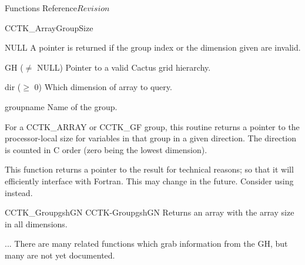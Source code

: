 \begin{cactuspart}{ Functions Reference}{}{$Revision$}
\begin{FunctionDescription}{CCTK\_ArrayGroupSize}{}
\begin{ResultSection}
\begin{Result}{NULL}
A  pointer is returned if the group index or the dimension given are invalid.
\end{Result}
\end{ResultSection}

\begin{ParameterSection}
\begin{Parameter}{GH ($\ne$ NULL)}
Pointer to a valid Cactus grid hierarchy.
\end{Parameter}
\begin{Parameter}{dir ($\ge$ 0)}
Which dimension of array to query.
\end{Parameter}
\begin{Parameter}{groupname}
Name of the group.
\end{Parameter}
\end{ParameterSection}

\begin{Discussion}
For a CCTK\_ARRAY or CCTK\_GF group, this routine returns a pointer to
the processor-local size for variables in that group in a given
direction. The direction is counted in C order (zero being the lowest
dimension).

This function returns a pointer to the result for technical reasons;
so that it will efficiently interface with Fortran.  This may change
in the future.  Consider using  instead.
\end{Discussion}

\begin{SeeAlsoSection}
\begin{SeeAlso2} {CCTK\_GroupgshGN} {CCTK-GroupgshGN}
Returns an array with the array size in all dimensions.
\end{SeeAlso2}
\begin{SeeAlso}{...}
There are many related functions which grab information from the GH,
but many are not yet documented.
\end{SeeAlso}
\end{SeeAlsoSection}
\end{FunctionDescription}



\end{cactuspart}
